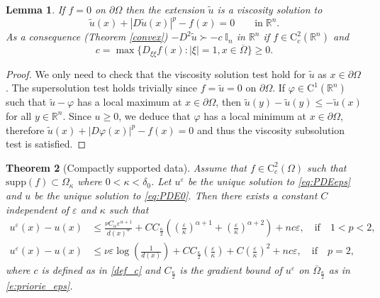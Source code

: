 \documentclass[12pt,reqno]{amsart}
\numberwithin{figure}{section}
\theoremstyle{plain}
\newtheorem{thm}{Theorem}[section]
\newtheorem{lem}[thm]{Lemma}
\theoremstyle{remark}
\numberwithin{equation}{section}
\newcommand{\R}{\mathbb{R}}
\begin{document}
\begin{lem} If $f = 0$ on $\partial\Omega$ then the extension $\tilde{u}$ is a viscosity solution to
\begin{equation*}
    \tilde{u}(x)+|D\tilde{u}(x)|^p - f(x) = 0 \qquad\text{in}\;\R^n.
\end{equation*}
As a consequence (Theorem \ref{convex}) $-D^2\tilde{u} \succ -c\;\mathbb{I}_n$ in $\R^n$ if $f\in \mathrm{C}_c^2(\R^n)$ and 
\begin{equation}\label{def_c}
    c = \max \big\lbrace  D_{\xi\xi}f(x): |\xi|=1, x\in \overline{\Omega} \big\rbrace\geq 0.
\end{equation}
\end{lem}
\begin{proof} We only need to check that the viscosity solution test hold for $\tilde{u}$ as $x\in \partial\Omega$. The supersolution test holds trivially since $f = \tilde{u} = 0$ on $\partial\Omega$. If $\varphi\in \mathrm{C}^1(\R^n)$ such that $\tilde{u} - \varphi$ has a local maximum at $x\in \partial\Omega$, then $\tilde{u}(y) - \tilde{u}(y) \leq - \tilde{u}(x)$ for all $y\in \R^n$. Since $u\geq 0$, we deduce that $\varphi$ has a local minimum at $x\in \partial\Omega$, therefore $\tilde{u}(x)+|D\varphi(x)|^p - f(x) = 0$ and thus the viscosity subsolution test is satisfied.
\end{proof}



\begin{thm}[Compactly supported data]\label{thm:rate_doubling2} Assume that $f\in \mathrm{C}^2_c(\Omega)$ such that $\mathrm{supp}(f)\subset\Omega_\kappa$ where $0<\kappa < \delta_{0}$. Let $u^\varepsilon$ be the unique solution to \eqref{eq:PDEeps} and $u$ be the unique solution to \eqref{eq:PDE0}. Then there exists a constant $C$ independent of $\varepsilon$ and $\kappa$ such that
\begin{equation*}
\begin{aligned}
    u^\varepsilon(x) - u(x) &\leq\frac{\nu C_\alpha \varepsilon^{\alpha+1}}{d(x)^\alpha} + CC_\frac{\kappa}{2} \left(\left(\frac{\varepsilon}{\kappa}\right)^{\alpha+1}+\left(\frac{\varepsilon}{\kappa}\right)^{\alpha+2}\right) + nc\varepsilon, \quad \text{if} \quad 1 < p <2, \\
    u^\varepsilon(x) - u(x) & \leq \nu \varepsilon \log\left( \frac{1}{d(x)}\right)+C C_\frac{\kappa}{2}\left(\frac{\varepsilon}{\kappa}\right) +C\left( \frac{\varepsilon}{\kappa}\right)^2 + nc \varepsilon, \quad \text{if} \quad p=2,
\end{aligned}
\end{equation*}
where $c$ is defined as in \eqref{def_c} and $C_\frac{\kappa}{2}$ is the gradient bound of $u^\varepsilon$ on $\overline{\Omega}_\frac{\kappa}{2}$ as in \eqref{e:priorie_eps}.
\end{thm}
\end{document}
